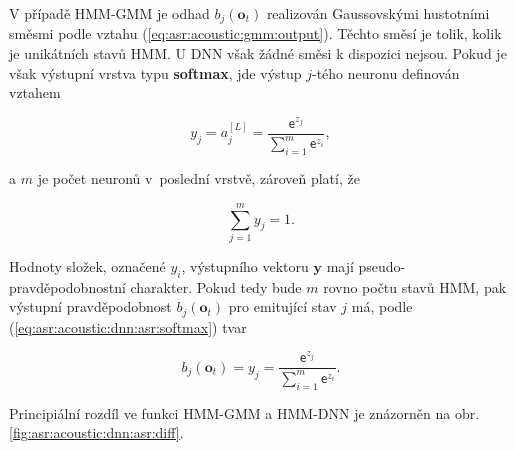 V případě HMM-GMM je odhad $b_j\left(\boldsymbol{o}_t\right)$ realizován Gaussovskými hustotními směsmi podle vztahu (\ref{eq:asr:acoustic:gmm:output}). Těchto směsí je tolik, kolik je unikátních stavů HMM. U DNN však žádné směsi k dispozici nejsou. Pokud je však výstupní vrstva typu \textbf{softmax}, jde výstup $j$-tého neuronu definován vztahem

\begin{equation}
  y_{j} = a_{j}^{[L]} = \frac{\mathsf{e}^{z_j}}{\sum_{i=1}^{m}\mathsf{e}^{z_i}},
  \label{eq:asr:acoustic:dnn:asr:softmax}
\end{equation}

\noindent a $m$ je počet neuronů v~poslední vrstvě, zároveň platí, že

\begin{equation}
  \sum_{j=1}^{m} y_{j} = 1.
  \label{eq:asr:acoustic:dnn:asr:softmax:criterium}
\end{equation}

\noindent Hodnoty složek, označené $y_{i}$, výstupního vektoru $\boldsymbol{y}$ mají pseudo-pravděpodobnostní charakter. Pokud tedy bude $m$ rovno počtu stavů HMM, pak výstupní pravděpodobnost $b_{j} \left(\boldsymbol{o}_t\right)$ pro emitující stav $j$ má, podle (\ref{eq:asr:acoustic:dnn:asr:softmax}) tvar

\begin{equation}
  b_{j} \left(\boldsymbol{o}_t\right) = y_{j} = \frac{\mathsf{e}^{z_j}}{\sum_{i=1}^{m}\mathsf{e}^{z_i}}.
  \label{eq:asr:acoustic:dnn:asr:softmax:criterium}
\end{equation}

\noindent Principiální rozdíl ve funkci HMM-GMM a HMM-DNN je znázorněn na obr. \ref{fig:asr:acoustic:dnn:asr:diff}.

